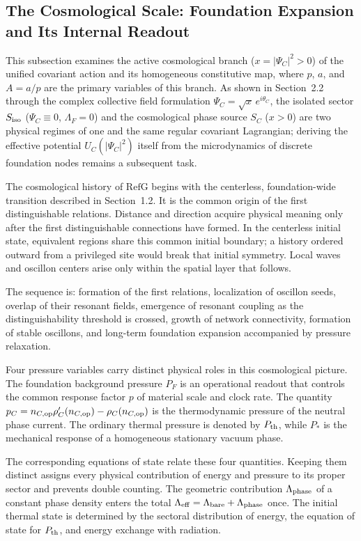 \documentclass[11pt,a4paper]{article}
\newcommand{\RefG}{\mathrm{RefG}}
\begin{document}
\subsection{The Cosmological Scale: Foundation Expansion and Its Internal Readout}

This subsection examines the active cosmological branch ($x = |\Psi_C|^2 > 0$) of the unified covariant action and its homogeneous constitutive map, where $p$, $a$, and $A=a/p$ are the primary variables of this branch. As shown in Section~2.2 through the complex collective field formulation $\Psi_C = \sqrt{x}\,e^{i\theta_C}$, the isolated sector $S_{\rm iso}$ ($\Psi_C \equiv 0$, $\Lambda_F = 0$) and the cosmological phase source $S_C$ ($x > 0$) are two physical regimes of one and the same regular covariant Lagrangian; deriving the effective potential $U_C(|\Psi_C|^2)$ itself from the microdynamics of discrete foundation nodes remains a subsequent task.

The cosmological history of $\RefG$ begins with the centerless, foundation-wide transition described in Section~1.2. It is the common origin of the first distinguishable relations. Distance and direction acquire physical meaning only after the first distinguishable connections have formed. In the centerless initial state, equivalent regions share this common initial boundary; a history ordered outward from a privileged site would break that initial symmetry. Local waves and oscillon centers arise only within the spatial layer that follows.

The sequence is: formation of the first relations, localization of oscillon seeds, overlap of their resonant fields, emergence of resonant coupling as the distinguishability threshold is crossed, growth of network connectivity, formation of stable oscillons, and long-term foundation expansion accompanied by pressure relaxation.

Four pressure variables carry distinct physical roles in this cosmological picture. The foundation background pressure $P_F$ is an operational readout that controls the common response factor $p$ of material scale and clock rate. The quantity $p_C=n_{C,{\rm op}}\rho_C'(n_{C,{\rm op}})-\rho_C(n_{C,{\rm op}})$ is the thermodynamic pressure of the neutral phase current. The ordinary thermal pressure is denoted by $P_{\rm th}$, while $P_*$ is the mechanical response of a homogeneous stationary vacuum phase.

The corresponding equations of state relate these four quantities. Keeping them distinct assigns every physical contribution of energy and pressure to its proper sector and prevents double counting. The geometric contribution $\Lambda_{\rm phase}$ of a constant phase density enters the total $\Lambda_{\rm eff}=\Lambda_{\rm bare}+\Lambda_{\rm phase}$ once. The initial thermal state is determined by the sectoral distribution of energy, the equation of state for $P_{\rm th}$, and energy exchange with radiation.
\end{document}
